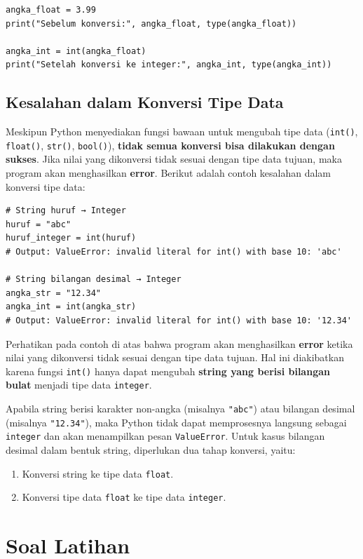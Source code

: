 \begin{lstlisting}[style=PythonStyle, caption={Kode Python: float_to_int.py}]
angka_float = 3.99
print("Sebelum konversi:", angka_float, type(angka_float))

angka_int = int(angka_float)
print("Setelah konversi ke integer:", angka_int, type(angka_int))
\end{lstlisting}

\subsection{Kesalahan dalam Konversi Tipe Data}
Meskipun Python menyediakan fungsi bawaan untuk mengubah tipe data (\texttt{int()}, \texttt{float()}, \texttt{str()}, \texttt{bool()}), \textbf{tidak semua konversi bisa dilakukan dengan sukses}. Jika nilai yang dikonversi tidak sesuai dengan tipe data tujuan, maka program akan menghasilkan \textbf{error}. Berikut adalah contoh kesalahan dalam konversi tipe data:

\begin{lstlisting}[style=PythonStyle]
# String huruf → Integer
huruf = "abc"
huruf_integer = int(huruf) 
# Output: ValueError: invalid literal for int() with base 10: 'abc'

# String bilangan desimal → Integer
angka_str = "12.34"
angka_int = int(angka_str)  
# Output: ValueError: invalid literal for int() with base 10: '12.34'
\end{lstlisting}

Perhatikan pada contoh di atas bahwa program akan menghasilkan \textbf{error} ketika nilai yang dikonversi tidak sesuai dengan tipe data tujuan. Hal ini diakibatkan karena fungsi \texttt{int()} hanya dapat mengubah \textbf{string yang berisi bilangan bulat} menjadi tipe data \texttt{integer}.
\par
Apabila string berisi karakter non-angka (misalnya \texttt{"abc"}) atau bilangan desimal (misalnya \texttt{"12.34"}), maka Python tidak dapat memprosesnya langsung sebagai \texttt{integer} dan akan menampilkan pesan \texttt{ValueError}. Untuk kasus bilangan desimal dalam bentuk string, diperlukan dua tahap konversi, yaitu:
\begin{enumerate}
	\item Konversi string ke tipe data \texttt{float}.
	\item Konversi tipe data \texttt{float} ke tipe data \texttt{integer}.
\end{enumerate}

\section{Soal Latihan}

